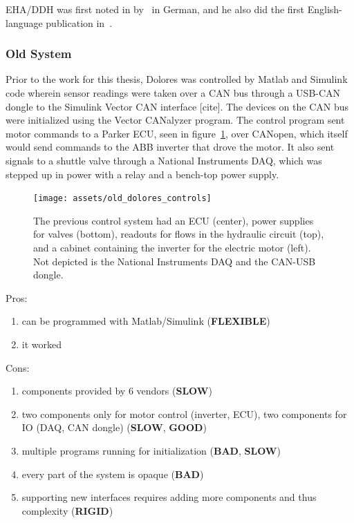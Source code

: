 \documentclass[english,12pt,a4paper,pdftex,eng,utf8]{aaltothesis}
\begin{document}
EHA/DDH was first noted in by~\cite{Helduser1995} in German, and he also did the first English-language publication in~\cite{Helduser1999}.

\subsubsection{Old System}

Prior to the work for this thesis, Dolores was controlled by Matlab and Simulink code wherein sensor readings were taken over a CAN bus through a USB-CAN dongle to the Simulink Vector CAN interface [cite].  The devices on the CAN bus were initialized using the Vector CANalyzer program.  The control program sent motor commands to a Parker ECU, seen in figure~\ref{fig:dolores_old_system}, over CANopen, which itself would send commands to the ABB inverter that drove the motor.  It also sent signals to a shuttle valve through a National Instruments DAQ, which was stepped up in power with a relay and a bench-top power supply.

\begin{figure}[h]
	\centering
	\texttt{[image: assets/old\_dolores\_controls]}
	\caption{The previous control system had an ECU (center), power supplies for valves (bottom), readouts for flows in the hydraulic circuit (top), and a cabinet containing the inverter for the electric motor (left).  Not depicted is the National Instruments DAQ and the CAN-USB dongle.}\label{fig:dolores_old_system}
\end{figure}

Pros:
\begin{enumerate}
	\item can be programmed with Matlab/Simulink (\textbf{FLEXIBLE})
	\item it worked
\end{enumerate}

Cons:
\begin{enumerate}
	\item components provided by 6 vendors (\textbf{SLOW})
	\item two components only for motor control (inverter, ECU), two components for IO (DAQ, CAN dongle) (\textbf{SLOW}, \textbf{GOOD})
	\item multiple programs running for initialization (\textbf{BAD}, \textbf{SLOW})
	\item every part of the system is opaque (\textbf{BAD})
	\item supporting new interfaces requires adding more components and thus complexity (\textbf{RIGID})
\end{enumerate}
\end{document}

